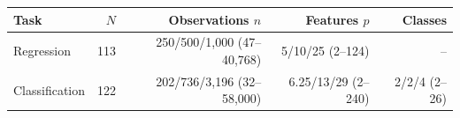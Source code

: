 \begin{tabular}{lrrrr}
\toprule
Task & $N$ & Observations $n$ & Features $p$ & Classes \\
\midrule
Regression & 113 & 250/500/1,000 (47--40,768) & 5/10/25 (2--124) & -- \\
Classification & 122 & 202/736/3,196 (32--58,000) & 6.25/13/29 (2--240) & 2/2/4 (2--26) \\
\bottomrule
\end{tabular}
